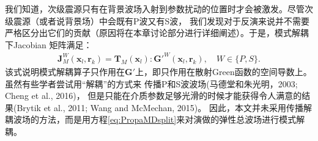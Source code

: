 我们知道，次级震源只有在背景波场入射到参数扰动的位置时才会被激发。尽管次级震源（或者说背景场）中会既有P波又有S波，
我们发现对于反演来说并不需要严格区分出它们的贡献（原因将在本章讨论部分进行详细阐述）。于是，模式解耦下Jacobian
矩阵满足：
\begin{equation}
        \begin{split} 
        \mathbf{J}^W_M(\mathbf{x}_l,\mathbf{r}_k)=
        \mathbf{T}_M(\mathbf{x}_l):\mathbf{G}'^W(\mathbf{x}_l,\mathbf{r}_k),\quad
        W\in\{P, S\}.
        \end{split}
        \label{eq:EquivFre1}
\end{equation}
该式说明模式解耦算子只作用在$\mathbf{G}'$上，即只作用在散射Green函数的空间导数上。虽然有些学者尝试用“解耦”的方式来
传播P和S波波场(马德堂和朱光明，2003\cite{马德堂2003}; Cheng et al.,
2016\cite{cheng:2016})，
但是只能在介质参数足够光滑的时候才能获得令人满意的结果(Brytik et al., 2011\cite{brytik:2011};
Wang and McMechan, 2015\cite{wang.mcmechan:2015b})。
因此，本文并未采用传播解耦波场的方法，而是用方程\eqref{eq:PropaMDsplit}来对演做的弹性总波场进行模式解耦。

